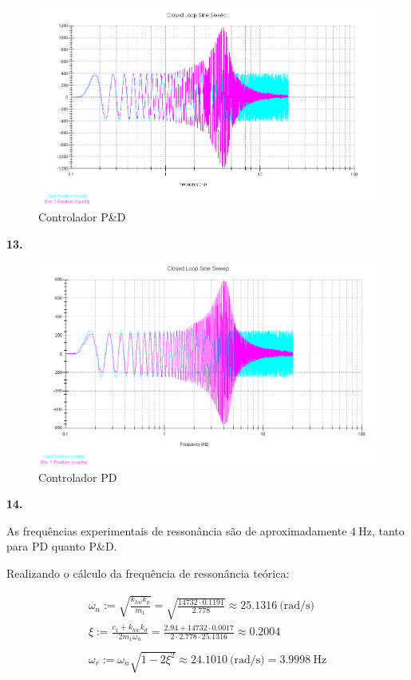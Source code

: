 \documentclass[a4paper,11pt]{article}
\begin{document}
\begin{figure}[H]
\includegraphics[scale=0.6]{q12}
\caption{Controlador P\&D}
\centering
\end{figure}

\textbf{13.}

\begin{figure}[H]
\includegraphics[scale=0.6]{q13}
\caption{Controlador PD}
\centering
\end{figure}

\textbf{14.}


As frequências experimentais de ressonância são de aproximadamente
$4 ~ \text{Hz}$, tanto para PD quanto P\&D.

Realizando o cálculo da frequência de ressonância teórica:

\begin{gather*}
    \omega_n := \sqrt{\frac{k_{hw} k_p}{m_1}} =
        \sqrt{\frac{14732 \cdot 0.1191}{2.778}}
        \approx 25.1316 ~ \text{(rad/s)} \\
    \xi := \frac{c_1 + k_{hw} k_d}{2 m_1 \omega_n} =
        \frac{2.94 + 14732 \cdot 0.0017}{2 \cdot 2.778 \cdot 25.1316} \approx
        0.2004 \\ \\
    \omega_r := \omega_n \sqrt{1 - 2 \xi^2} \approx 24.1010 ~ \text{(rad/s)} =
        3.9998 ~ \text{Hz}
\end{gather*}
\end{document}
